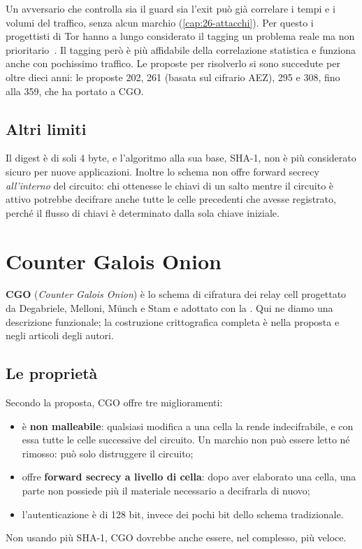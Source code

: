 \begin{approfondimento}
Un avversario che controlla sia il guard sia l'exit può già correlare i tempi e i volumi del traffico, senza alcun marchio (\cref{cap:26-attacchi}). Per questo i progettisti di Tor hanno a lungo considerato il tagging un problema reale ma non prioritario~\cite{dingledine2004tor}. Il tagging però è più affidabile della correlazione statistica e funziona anche con pochissimo traffico. Le proposte per risolverlo si sono succedute per oltre dieci anni: le proposte 202, 261 (basata sul cifrario AEZ), 295 e 308, fino alla 359, che ha portato a CGO.
\end{approfondimento}

\subsection{Altri limiti}

Il digest è di soli 4 byte, e l'algoritmo alla sua base, SHA-1, non è più considerato sicuro per nuove applicazioni. Inoltre lo schema non offre forward secrecy \emph{all'interno} del circuito: chi ottenesse le chiavi di un salto mentre il circuito è attivo potrebbe decifrare anche tutte le celle precedenti che avesse registrato, perché il flusso di chiavi è determinato dalla sola chiave iniziale.

\section{Counter Galois Onion}\label{sec:cgo}

\textbf{CGO} (\emph{Counter Galois Onion}) è lo schema di cifratura dei relay cell progettato da Degabriele, Melloni, Münch e Stam e adottato con la . Qui ne diamo una descrizione funzionale; la costruzione crittografica completa è nella proposta e negli articoli degli autori.

\subsection{Le proprietà}

Secondo la proposta, CGO offre tre miglioramenti:
\begin{itemize}
  \item è \textbf{non malleabile}: qualsiasi modifica a una cella la rende indecifrabile, e con essa tutte le celle successive del circuito. Un marchio non può essere letto né rimosso: può solo distruggere il circuito;
  \item offre \textbf{forward secrecy a livello di cella}: dopo aver elaborato una cella, una parte non possiede più il materiale necessario a decifrarla di nuovo;
  \item l'autenticazione è di 128 bit, invece dei pochi bit dello schema tradizionale.
\end{itemize}
Non usando più SHA-1, CGO dovrebbe anche essere, nel complesso, più veloce.

